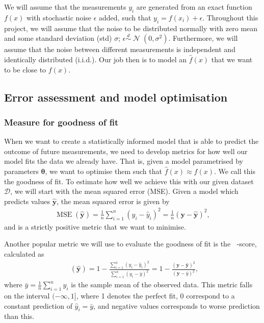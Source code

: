\documentclass[twocolumn,english,notitlepage]{article}
\renewcommand{\vec}[1]{\boldsymbol{#1}}
\newcommand{\pclosed}[1]{\left(#1\right)}
\newcommand{\normal}[2]{\operatorname{\mathcal{N}}\pclosed{#1,#2}}
\newcommand{\distas}{\overset{d}{\sim}}
\DeclareMathOperator{\mse}{MSE}
\DeclareMathOperator{\Rsquared}{R^2}
\begin{document}
    We will assume that the measurements $y_i$ are generated from an exact function $f(x)$ with stochastic noise $\epsilon$ added, such that $y_i = f(x_i) + \epsilon$. Throughout this project, we will assume that the noise to be distributed normally with zero mean and some standard deviation (std) $\sigma$; $\epsilon \distas \normal{0}{\sigma^2}$. Furthermore, we will assume that the noise between different measurements is independent and identically distributed (i.i.d.). Our job then is to model an $\hat{f}(x)$ that we want to be close to $f(x)$.

    \subsection{Error assessment and model optimisation}

    \subsubsection*{Measure for goodness of fit}
        When we want to create a statistically informed model that is able to predict the outcome of future measurements, we need to develop metrics for how well our model fits the data we already have. That is, given a model parametrised by parameters $\vec{\theta}$, we want to optimise them such that $\hat{f}(x) \approx f(x)$. We call this the goodness of fit. To estimate how well we achieve this with our given dataset $\mathcal{D}$, we will start with the mean squared error (MSE). Given a model which predicts values $\vec{\hat{y}}$, the mean squared error is given by
        \begin{align}
            \mse(\vec{\hat{y}}) = \frac{1}{n} \sum_{i=1}^n (y_i-\hat{y}_i)^2 = \frac{1}{n} (\vec{y} - \vec{\hat{y}})^2,
            \label{theo:eq:mse}
        \end{align}
        and is a strictly positive metric that we want to minimise.

        Another popular metric we will use to evaluate the goodness of fit is the $\Rsquared$-score, calculated as
        \begin{align}
            \Rsquared(\vec{\hat{y}}) = 1 - \frac{\sum_{i=1}^n (y_i-\hat{y}_i)^2}{\sum_{i=1}^n (y_i-\bar{y})^2} = 1 - \frac{(\vec{y}-\vec{\hat{y}})^2}{(\vec{y}-\bar{y})^2},
            \label{theo:eq:r2}
        \end{align}
        where $\bar{y} = \frac{1}{n}\sum_{i=1}^n y_i$ is the sample mean of the observed data. This metric falls on the interval $(-\infty, 1]$, where 1 denotes the perfect fit, 0 correspond to a constant prediction of $\hat{y}_i = \bar{y}$, and negative values corresponds to worse prediction than this.
\end{document}

